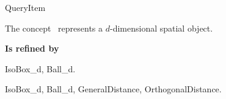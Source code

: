 

\begin{ccRefConcept}{QueryItem}


\ccDefinition
  
The concept \ccClassTemplateName\ represents a 
$d$-dimensional spatial object.

{\bf Is refined by}

IsoBox\_d, Ball\_d.

\ccSeeAlso

IsoBox\_d, Ball\_d, GeneralDistance, OrthogonalDistance.


\end{ccRefConcept}


